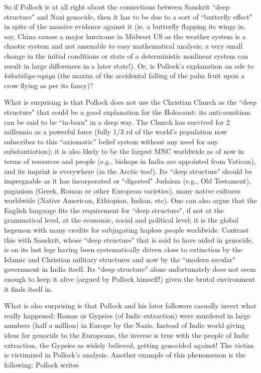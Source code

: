 So if Pollock is at all right about the connections between Sanskrit ``deep structure" and Nazi genocide, then it has to be due to a sort of ``butterfly effect" in spite of the massive evidence against it (ie. a butterfly flapping its wings in, say, China causes a major hurricane in Midwest US as the weather system is a chaotic system and not amenable to easy mathematical analysis; a very small change in the initial conditions or state of a deterministic nonlinear system can result in large differences in a later state!). Or, is Pollock's explanation an ode to {\sl kākatālīya-nyāya} (the maxim of the accidental falling of the palm fruit upon a crow flying as per its fancy)?

What is surprising is that Pollock does not use the Christian Church as the ``deep structure" that could be a good explanation for the Holocaust: its anti-semitism can be said to be ``in-born" in a deep way. The Church has survived for 2 millennia as a powerful force (fully 1/3 rd of the world's population now subscribes to this “axiomatic” belief system without any need for any substantiation); it is also likely to be the largest MNC worldwide as of now in terms of resources and people (e.g., bishops in India are appointed from Vatican), and its imprint is everywhere (in the Arctic too!). Its ``deep structure" should be impregnable as it has incorporated or ``digested" Judaism (e.g., Old Testament), paganism (Greek, Roman or other European varieties), many native cultures worldwide (Native American, Ethiopian, Indian, etc). One can also argue that the English language fits the requirement for ``deep structure", if not at the grammatical level, at the economic, social and political level; it is the global hegemon with many credits for subjugating hapless people worldwide. Contrast this with Sanskrit, whose “deep structure" that is said to have aided in genocide, is on its last legs having been systematically driven close to extinction by the Islamic and Christian military structures and now by the ``modern secular" government in India itself. Its ``deep structure" alone unfortunately does not seem enough to keep it alive (argued by Pollock himself!) given the brutal environment it finds itself in.

What is also surprising is that Pollock and his later followers casually invert what really happened: Romas or Gypsies (of Indic extraction) were murdered in large numbers (half a million) in Europe by the Nazis. Instead of Indic world giving ideas for genocide to the Europeans, the inverse is true with the people of Indic extraction, the Gypsies as widely believed, getting genocided against! The victim is victimized in Pollock's analysis. Another example of this phenomenon is the following: Pollock writes


